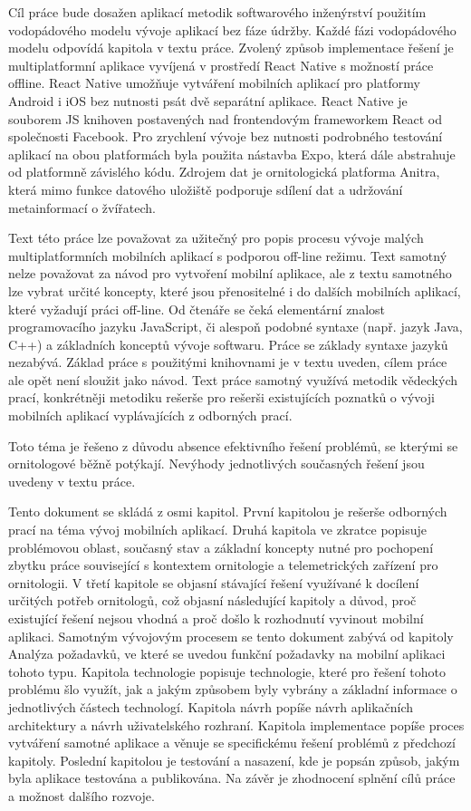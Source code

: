 Cíl práce bude dosažen aplikací metodik softwarového inženýrství použitím vodopádového modelu vývoje aplikací bez fáze údržby. Každé fázi vodopádového modelu odpovídá kapitola v textu práce. Zvolený způsob implementace řešení je multiplatformní aplikace vyvíjená v prostředí React Native s možností práce offline. React Native umožňuje vytváření mobilních aplikací pro platformy Android i iOS bez nutnosti psát dvě separátní aplikace. React Native je souborem JS knihoven postavených nad frontendovým frameworkem React od společnosti Facebook. Pro zrychlení vývoje bez nutnosti podrobného testování aplikací na obou platformách byla použita nástavba Expo, která dále abstrahuje od platformně závislého kódu. Zdrojem dat je ornitologická platforma Anitra, která mimo funkce datového uložiště podporuje sdílení dat a udržování metainformací o žvířatech.

Text této práce lze považovat za užitečný pro popis procesu vývoje malých multiplatformních mobilních aplikací s podporou off-line režimu. Text samotný nelze považovat za návod pro vytvoření mobilní aplikace, ale z textu samotného lze vybrat určité koncepty, které jsou přenositelné i do dalších mobilních aplikací, které vyžadují práci off-line. Od čtenáře se čeká elementární znalost programovacího jazyku JavaScript, či alespoň podobné syntaxe (např. jazyk Java, C++) a základních konceptů vývoje softwaru. Práce se základy syntaxe jazyků nezabývá. Základ práce s použitými knihovnami je v textu uveden, cílem práce ale opět není sloužit jako návod.  Text práce samotný využívá metodik vědeckých prací, konkrétněji metodiku rešerše pro rešerši existujících poznatků o vývoji mobilních aplikací vyplávajících z odborných prací. 

Toto téma je řešeno z důvodu absence efektivního řešení problémů, se kterými se ornitologové běžně potýkají. Nevýhody jednotlivých současných řešení jsou uvedeny v textu práce.

Tento dokument se skládá z osmi kapitol. První kapitolou je rešerše odborných prací na téma vývoj mobilních aplikací. Druhá kapitola ve zkratce popisuje problémovou oblast, současný stav a základní koncepty nutné pro pochopení zbytku práce související s kontextem ornitologie a telemetrických zařízení pro ornitologii. V třetí kapitole se objasní stávající řešení využívané k docílení určitých potřeb ornitologů, což objasní následující kapitoly a důvod, proč existující řešení nejsou vhodná a proč došlo k rozhodnutí vyvinout mobilní aplikaci. Samotným vývojovým procesem se tento dokument zabývá od kapitoly Analýza požadavků, ve které se uvedou funkční požadavky na mobilní aplikaci tohoto typu. Kapitola technologie popisuje technologie, které pro řešení tohoto problému šlo využít, jak a jakým způsobem byly vybrány a základní informace o jednotlivých částech technologí. Kapitola návrh popíše návrh aplikačních architektury a návrh uživatelského rozhraní. Kapitola implementace popíše proces vytváření samotné aplikace a věnuje se specifickému řešení problémů z předchozí kapitoly. Poslední kapitolou je testování a nasazení, kde je popsán způsob, jakým byla aplikace testována a publikována. Na závěr je zhodnocení splnění cílů práce a možnost dalšího rozvoje.